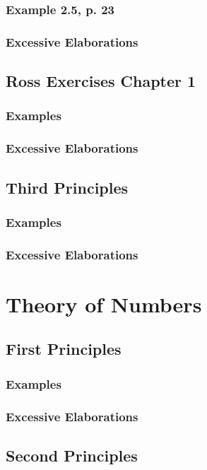 \documentclass{book}
\begin{document}
\subsection{Example 2.5, p. 23}


\subsection{Excessive Elaborations}

\section{Ross Exercises Chapter 1}
\subsection{Examples}
\subsection{Excessive Elaborations}

\section{Third Principles}
\subsection{Examples}
\subsection{Excessive Elaborations}


\chapter{Theory of Numbers}

\section{First Principles}
\subsection{Examples}
\subsection{Excessive Elaborations}

\section{Second Principles}
\end{document}
